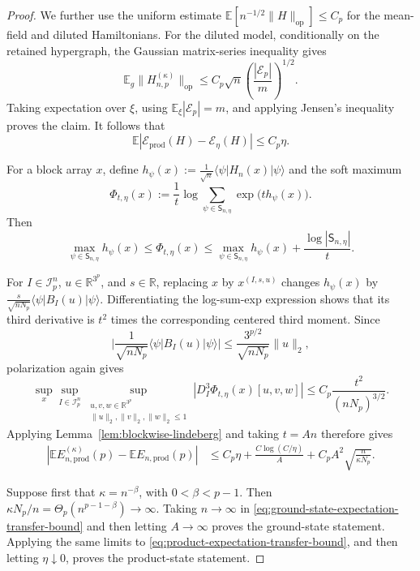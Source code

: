 \documentclass[12pt]{article}
\newcommand{\E}{\mathbb{E}}
\newcommand{\R}{\mathbb{R}}
\newcommand{\mcE}{\mathcal{E}}
\newcommand{\mcI}{\mathcal{I}}
\begin{document}
\begin{appendix}
\begin{proof}
We further use the uniform estimate
\(\E[n^{-1/2}\|H\|_{\mathrm{op}}]\le C_p\) for the mean-field and
diluted Hamiltonians. For the diluted model, conditionally on the
retained hypergraph, the Gaussian matrix-series inequality
\cite[Theorem~1.2]{tropp2012User} gives
\[
    \E_g\|H_{n,p}^{(\kappa)}\|_{\mathrm{op}}
    \le
    C_p\sqrt n
    \left(\frac{|\mcE_p|}{m}\right)^{1/2}.
\]
Taking expectation over \(\xi\), using
\(\E_\xi|\mcE_p|=m\), and applying Jensen's inequality proves the claim.
It follows that
\[
    \E\left|
        \mathcal E_{\mathrm{prod}}(H)-\mathcal E_\eta(H)
    \right|
    \le
    C_p\eta.
\]

For a block array \(x\), define $h_\psi(x)
    :=
    \frac1{\sqrt n}
    \langle\psi|H_n(x)|\psi\rangle$ and the soft maximum
\[
    \Phi_{t,\eta}(x)
    :=
    \frac1t
    \log
    \sum_{\psi\in\mathsf S_{n,\eta}}
    \exp\bigl(t h_\psi(x)\bigr).
\]
Then
\[
    \max_{\psi\in\mathsf S_{n,\eta}}h_\psi(x)
    \le
    \Phi_{t,\eta}(x)
    \le
    \max_{\psi\in\mathsf S_{n,\eta}}h_\psi(x)
    +
    \frac{\log|\mathsf S_{n,\eta}|}{t}.
\]

For \(I\in\mcI_p^n\), \(u\in\R^{3^p}\), and \(s\in\R\), replacing \(x\)
by \(x^{(I,s,u)}\) changes \(h_\psi(x)\) by $\frac{s}{\sqrt{nN_p}}
    \langle\psi|B_I(u)|\psi\rangle$. Differentiating the log-sum-exp expression shows that its third
derivative is \(t^2\) times the corresponding centered third moment.
Since
\[
    \bigg|
        \frac{1}{\sqrt{nN_p}}
        \langle\psi|B_I(u)|\psi\rangle
    \bigg|
    \le
    \frac{3^{p/2}}{\sqrt{nN_p}}\|u\|_2,
\]
polarization again gives
\[
    \sup_x
    \sup_{I\in\mcI_p^n}
    \sup_{\substack{u,v,w\in\R^{3^p}\\
                    \|u\|_2,\|v\|_2,\|w\|_2\le1}}
    \left|
        D_I^3\Phi_{t,\eta}(x)[u,v,w]
    \right|
    \le
    C_p\frac{t^2}{(nN_p)^{3/2}}.
\]
Applying Lemma~\ref{lem:blockwise-lindeberg} and taking \(t=An\)
therefore gives
\begin{align}
\label{eq:product-expectation-transfer-bound}
|
    \E E_{n,\mathrm{prod}}^{(\kappa)}(p)
    -
    \E E_{n,\mathrm{prod}}(p)
|
&\le
C_p\eta
+
\frac{C\log(C/\eta)}{A}
+
C_pA^2
\sqrt{\frac{n}{\kappa N_p}}.
\end{align}

Suppose first that \(\kappa=n^{-\beta}\), with
\(0<\beta<p-1\). Then $\kappa N_p/n
    =
    \Theta_p(n^{p-1-\beta})
    \to\infty$. Taking \(n\to\infty\) in
\eqref{eq:ground-state-expectation-transfer-bound} and then letting
\(A\to\infty\) proves the ground-state statement. Applying the same
limits to \eqref{eq:product-expectation-transfer-bound}, and then
letting \(\eta\downarrow0\), proves the product-state statement.


\end{proof}
\end{appendix}
\end{document}
